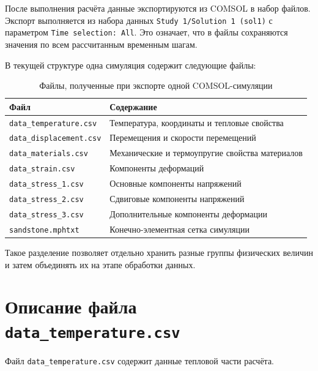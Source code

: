 После выполнения расчёта данные экспортируются из COMSOL в набор файлов. Экспорт выполняется из набора данных \texttt{Study 1/Solution 1 (sol1)} с параметром \texttt{Time selection: All}. Это означает, что в файлы сохраняются значения по всем рассчитанным временным шагам.

В текущей структуре одна симуляция содержит следующие файлы:

\begin{table}[h!]
\centering
\caption{Файлы, полученные при экспорте одной COMSOL-симуляции}
\label{tab:exported_files}
\begin{tabular}{|l|p{9cm}|}
\hline
\textbf{Файл} & \textbf{Содержание} \\
\hline
\texttt{data\_temperature.csv} & Температура, координаты и тепловые свойства \\
\hline
\texttt{data\_displacement.csv} & Перемещения и скорости перемещений \\
\hline
\texttt{data\_materials.csv} & Механические и термоупругие свойства материалов \\
\hline
\texttt{data\_strain.csv} & Компоненты деформаций \\
\hline
\texttt{data\_stress\_1.csv} & Основные компоненты напряжений \\
\hline
\texttt{data\_stress\_2.csv} & Сдвиговые компоненты напряжений \\
\hline
\texttt{data\_stress\_3.csv} & Дополнительные компоненты деформации \\
\hline
\texttt{sandstone.mphtxt} & Конечно-элементная сетка симуляции \\
\hline
\end{tabular}
\end{table}

Такое разделение позволяет отдельно хранить разные группы физических величин и затем объединять их на этапе обработки данных.

\section{Описание файла \texttt{data\_temperature.csv}}

Файл \texttt{data\_temperature.csv} содержит данные тепловой части расчёта.

